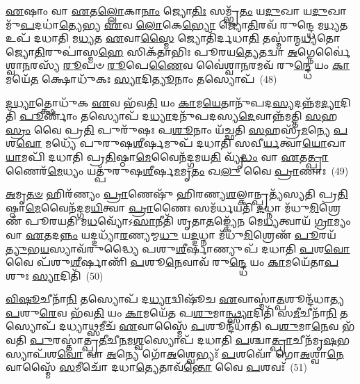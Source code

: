 {\anuvakamend[{\-\ul{𑌏}\-𑌷 𑌵𑍈 \ul{𑌪}\-𑌶𑍁𑌰𑍍𑌯𑌮᳴𑌸𑌰𑍍𑌪\-\ul{𑌦𑍇}\-𑌷 𑌯𑌤𑍍𑌤\-\ul{𑌸𑍍𑌮𑌾}\-𑌤𑍍𑌤𑌸𑍍𑌮𑌾॑\-\ul{𑌥𑍍𑌸}\-𑌪𑍍𑌤𑌵𑌿𑍞᳴𑌶𑌤𑌿𑌶𑍍𑌚}]}%

\-\ul{𑌏}\-𑌷𑌾𑌂 𑌵𑌾 \ul{𑌏}\-𑌤\-\ul{𑌲𑍍𑌲𑍋}\-𑌕𑌾\-\ul{𑌨𑌾𑌂} 𑌜𑍍𑌯𑍋\-\ul{𑌤𑌿𑌃} 𑌸𑌮𑍍𑌭𑍃᳴\-\ul{𑌤𑌂} 𑌯\-\ul{𑌦𑍁}\-𑌖𑌾 𑌯\-\ul{𑌦𑍁}\-𑌖𑌾𑌮𑍁᳴\-\ul{𑌪}\-𑌦𑌧𑌾॑\-\ul{𑌤𑍍𑌯𑍇}\-𑌭𑍍𑌯 \ul{𑌏}\-𑌵 \ul{𑌲𑍋}\-𑌕𑍇\-\ul{𑌭𑍍𑌯𑍋} 𑌜𑍍𑌯𑍋\-\ul{𑌤𑌿}\-𑌰𑌵᳴ 𑌰𑍁𑌨𑍍𑌦𑍍𑌧𑍇 𑌮\-\ul{𑌧𑍍𑌯}\-𑌤 𑌉𑌪᳴ 𑌦𑌧𑌾𑌤𑌿 𑌮\-\ul{𑌧𑍍𑌯}\-𑌤 \ul{𑌏}\-𑌵𑌾\-\ul{𑌸𑍍𑌮𑍈} 𑌜𑍍𑌯𑍋𑌤𑌿᳴𑌰𑍍𑌦𑌧𑌾\-\ul{𑌤𑌿} 𑌤𑌸𑍍𑌮𑌾॑𑌨𑍍𑌮\-\ul{𑌧𑍍𑌯}\-𑌤𑍋 𑌜𑍍𑌯𑍋\-\ul{𑌤𑌿}\-𑌰𑍁𑌪𑌾॑𑌸𑍍𑌮\-\ul{𑌹𑍇} 𑌸𑌿𑌕᳴𑌤𑌾𑌭𑌿𑌃 𑌪𑍂𑌰𑌯\-\ul{𑌤𑍍𑌯𑍇}\-𑌤𑌦𑍍𑌵𑌾 \ul{𑌅}\-𑌗𑍍𑌨𑍇𑌰𑍍𑌵𑍈॑𑌶𑍍𑌵𑌾\-\ul{𑌨}\-𑌰𑌸𑍍𑌯᳴ \ul{𑌰𑍂}\-𑌪𑍞 \ul{𑌰𑍂}\-𑌪𑍇\-\ul{𑌣𑍈}\-𑌵 𑌵𑍈॑𑌶𑍍𑌵𑌾\-\ul{𑌨}\-𑌰𑌮𑌵᳴ 𑌰𑍁\-\ul{𑌨𑍍𑌦𑍍𑌧𑍇} 𑌯𑌂 \ul{𑌕𑌾}\-𑌮𑌯𑍇᳴\-\ul{𑌤} 𑌕𑍍𑌷𑍋𑌧𑍁᳴𑌕𑌃 \ul{𑌸𑍍𑌯𑌾}\-𑌦𑌿\-\ul{𑌤𑍍𑌯𑍂}\-𑌨𑌾𑌂 𑌤𑌸𑍍𑌯𑍋𑌪᳴~(48)

\-\ul{𑌦}\-\-\ul{𑌧𑍍𑌯𑌾}\-𑌤𑍍𑌕𑍍𑌷𑍋𑌧𑍁᳴𑌕 \ul{𑌏}\-𑌵 𑌭᳴𑌵\-\ul{𑌤𑌿} 𑌯𑌂 \ul{𑌕𑌾}\-𑌮\-\ul{𑌯𑍇}\-𑌤𑌾𑌨𑍁᳴𑌪𑌦\-\ul{𑌸𑍍𑌯}\-𑌦𑌨𑍍𑌨᳴𑌮\-\ul{𑌦𑍍𑌯𑌾}\-𑌦𑌿𑌤𑌿᳴ \ul{𑌪𑍂}\-𑌰𑍍𑌣𑌾𑌂 𑌤𑌸𑍍𑌯𑍋𑌪᳴ 𑌦\-\ul{𑌧𑍍𑌯𑌾}\-𑌦𑌨𑍁᳴𑌪𑌦𑌸𑍍𑌯\-\ul{𑌦𑍇}\-𑌵𑌾𑌨𑍍𑌨᳴𑌮𑌤𑍍𑌤𑌿 \ul{𑌸}\-𑌹\-\ul{𑌸𑍍𑌰𑌂} 𑌵𑍈 𑌪𑍍𑌰\-\ul{𑌤𑌿} 𑌪𑍁𑌰𑍁᳴𑌷𑌃 𑌪\-\ul{𑌶𑍂}\-𑌨𑌾𑌂 𑌯᳴𑌚𑍍𑌛𑌤𑌿 \ul{𑌸}\-𑌹𑌸𑍍𑌰᳴\-\ul{𑌮}\-𑌨𑍍𑌯𑍇 \ul{𑌪}\-𑌶\-\ul{𑌵𑍋} 𑌮𑌧𑍍𑌯𑍇᳴ 𑌪𑍁𑌰𑍁𑌷\-\ul{𑌶𑍀}\-𑌰𑍍\mbox{}𑌷𑌮𑍁𑌪᳴ 𑌦𑌧𑌾𑌤𑌿 𑌸𑌵𑍀\-\ul{𑌰𑍍𑌯}\-𑌤𑍍𑌵𑌾\-\ul{𑌯𑍋}\-𑌖𑌾\-\ul{𑌯𑌾}\-𑌮𑌪𑌿᳴ 𑌦𑌧𑌾𑌤𑌿 𑌪𑍍𑌰\-\ul{𑌤𑌿}\-𑌷𑍍𑌠𑌾\-\ul{𑌮𑍇}\-𑌵𑍈𑌨᳴𑌦𑍍𑌗𑌮𑌯\-\ul{𑌤𑌿} 𑌵𑍍𑌯𑍃᳴\-\ul{𑌦𑍍𑌧𑌂} 𑌵𑌾 \ul{𑌏}\-𑌤\-\ul{𑌤𑍍𑌪𑍍𑌰𑌾}\-𑌣𑍈𑌰᳴\-\ul{𑌮𑍇}\-𑌧𑍍𑌯𑌂 𑌯𑌤𑍍𑌪𑍁᳴𑌰𑍁𑌷\-\ul{𑌶𑍀}\-𑌰𑍍\mbox{}𑌷\-\ul{𑌮}\-𑌮𑍃\-\ul{𑌤𑌂} 𑌖\-\ul{𑌲𑍁} 𑌵𑍈 \ul{𑌪𑍍𑌰𑌾}\-𑌣𑌾𑌃~(49)

\-\ul{𑌅}\-𑌮𑍃\-\ul{𑌤}\-\-\ul{𑍞} 𑌹𑌿𑌰᳴𑌣𑍍𑌯𑌂 \ul{𑌪𑍍𑌰𑌾}\-𑌣𑍇𑌷𑍁᳴ 𑌹𑌿𑌰𑌣𑍍𑌯\-\ul{𑌶}\-𑌲𑍍𑌕𑌾𑌨𑍍𑌪𑍍𑌰𑌤𑍍𑌯᳴𑌸𑍍𑌯𑌤𑌿 𑌪𑍍𑌰\-\ul{𑌤𑌿}\-𑌷𑍍𑌠𑌾\-\ul{𑌮𑍇}\-𑌵𑍈𑌨᳴𑌦𑍍𑌗𑌮\-\ul{𑌯𑌿}\-𑌤𑍍𑌵𑌾 \ul{𑌪𑍍𑌰𑌾}\-𑌣𑍈𑌃 𑌸𑌮᳴𑌰𑍍𑌧𑌯𑌤𑌿 \ul{𑌦}\-𑌧𑍍𑌨𑌾 𑌮᳴𑌧𑍁\-\ul{𑌮𑌿}\-𑌶𑍍𑌰𑍇𑌣᳴ 𑌪𑍂𑌰𑌯𑌤𑌿 𑌮\-\ul{𑌧}\-𑌵𑍍𑌯𑍋᳴\-𑌽\-\ul{𑌸𑌾}\-𑌨𑍀𑌤𑌿᳴ 𑌶𑍃𑌤𑌾\-\ul{𑌤}\-𑌙𑍍𑌕𑍍𑌯𑍇᳴𑌨 𑌮𑍇\-\ul{𑌧𑍍𑌯}\-𑌤𑍍𑌵𑌾𑌯᳴ \ul{𑌗𑍍𑌰𑌾}\-𑌮𑍍𑌯𑌂 𑌵𑌾 \ul{𑌏}\-𑌤𑌦\-\ul{𑌨𑍍𑌨𑌂} 𑌯𑌦𑍍𑌦𑌧𑍍𑌯𑌾᳴\-\ul{𑌰}\-𑌣𑍍𑌯𑌮𑍍𑌮\-\ul{𑌧𑍁} 𑌯\-\ul{𑌦𑍍𑌦}\-𑌧𑍍𑌨𑌾 𑌮᳴𑌧𑍁\-\ul{𑌮𑌿}\-𑌶𑍍𑌰𑍇𑌣᳴ \ul{𑌪𑍂}\-𑌰𑌯᳴\-\ul{𑌤𑍍𑌯𑍁}\-𑌭\-\ul{𑌯}\-𑌸𑍍𑌯𑌾𑌵᳴𑌰𑍁𑌦𑍍𑌧𑍍𑌯𑍈 𑌪𑌶𑍁\-\ul{𑌶𑍀}\-𑌰𑍍\mbox{}𑌷𑌾𑌣𑍍𑌯𑍁𑌪᳴ 𑌦𑌧𑌾𑌤𑌿 \ul{𑌪}\-𑌶\-\ul{𑌵𑍋} 𑌵𑍈 𑌪᳴𑌶𑍁\-\ul{𑌶𑍀}\-𑌰𑍍\mbox{}𑌷𑌾𑌣𑌿᳴ \ul{𑌪}\-𑌶𑍂\-\ul{𑌨𑍇}\-𑌵𑌾𑌵᳴ 𑌰𑍁\-\ul{𑌨𑍍𑌦𑍍𑌧𑍇} 𑌯𑌂 \ul{𑌕𑌾}\-𑌮𑌯𑍇᳴𑌤𑌾\-\ul{𑌪}\-𑌶𑍁𑌃 \ul{𑌸𑍍𑌯𑌾}\-𑌦𑌿𑌤𑌿᳴~(50)

\-\ul{𑌵𑌿}\-\-\ul{𑌷𑍂}\-𑌚𑍀𑌨𑌾᳴\-\ul{𑌨𑌿} 𑌤𑌸𑍍𑌯𑍋𑌪᳴ 𑌦\-\ul{𑌧𑍍𑌯𑌾}\-𑌦𑍍𑌵𑌿𑌷𑍂᳴𑌚 \ul{𑌏}\-𑌵𑌾𑌸𑍍𑌮𑌾॑\-\ul{𑌤𑍍𑌪}\-𑌶𑍂𑌨𑍍𑌦᳴𑌧𑌾𑌤𑍍𑌯\-\ul{𑌪}\-𑌶𑍁\-\ul{𑌰𑍇}\-𑌵 𑌭᳴𑌵\-\ul{𑌤𑌿} 𑌯𑌂 \ul{𑌕𑌾}\-𑌮𑌯𑍇᳴𑌤 𑌪\-\ul{𑌶𑍁}\-𑌮𑌾\-\ul{𑌨𑍍𑌥𑍍𑌸𑍍𑌯𑌾}\-𑌦𑌿𑌤𑌿᳴ 𑌸\-\ul{𑌮𑍀}\-𑌚𑍀𑌨𑌾᳴\-\ul{𑌨𑌿} 𑌤𑌸𑍍𑌯𑍋𑌪᳴ 𑌦𑌧𑍍𑌯𑌾\-\ul{𑌥𑍍𑌸}\-𑌮𑍀𑌚᳴ \ul{𑌏}\-𑌵𑌾𑌸𑍍𑌮𑍈᳴ \ul{𑌪}\-𑌶𑍂𑌨𑍍𑌦᳴𑌧𑌾𑌤𑌿 𑌪\-\ul{𑌶𑍁}\-𑌮𑌾\-\ul{𑌨𑍇}\-𑌵 𑌭᳴𑌵𑌤𑌿 \ul{𑌪𑍁}\-𑌰𑌸𑍍𑌤𑌾॑𑌤𑍍𑌪𑍍𑌰\-\ul{𑌤𑍀}\-𑌚𑍀\-\ul{𑌨}\-𑌮\-\ul{𑌶𑍍𑌵}\-𑌸𑍍𑌯𑍋𑌪᳴ 𑌦𑌧𑌾𑌤𑌿 \ul{𑌪}\-𑌶𑍍𑌚𑌾\-\ul{𑌤𑍍𑌪𑍍𑌰𑌾}\-𑌚𑍀𑌨᳴𑌮𑍃\-\ul{𑌷}\-𑌭𑌸𑍍𑌯𑌾𑌪᳴𑌶\-\ul{𑌵𑍋} 𑌵𑌾 \ul{𑌅}\-𑌨𑍍𑌯𑍇 𑌗𑍋᳴\-\ul{𑌅}\-𑌶𑍍𑌵𑍇𑌭𑍍𑌯𑌃᳴ \ul{𑌪}\-𑌶𑌵𑍋᳴ 𑌗𑍋\-\ul{𑌅}\-𑌶𑍍𑌵𑌾\-\ul{𑌨𑍇}\-𑌵𑌾𑌸𑍍𑌮𑍈᳴ \ul{𑌸}\-𑌮𑍀𑌚𑍋᳴ 𑌦𑌧𑌾\-\ul{𑌤𑍍𑌯𑍇}\-𑌤𑌾𑌵᳴\-\ul{𑌨𑍍𑌤𑍋} 𑌵𑍈 \ul{𑌪}\-𑌶𑌵𑌃᳴~(51)

